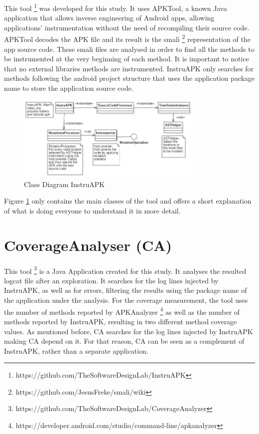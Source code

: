 This tool \footnote{https://github.com/TheSoftwareDesignLab/InstruAPK} was developed for this study. It uses APKTool, a known Java application that allows inverse engineering of Android apps, allowing applications' instrumentation without the need of recompiling their source code. APKTool decodes the APK file and its result is the smali \footnote{https://github.com/JesusFreke/smali/wiki} representation of the app source code. These smali files are analysed in order to find all the methods to be instrumented at the very beginning of each method. It is important to notice that no external libraries methods are instrumented. InstruAPK only searches for methods following the android project structure that uses the application package name to store the application source code.

\begin{figure}[h]
\centering
\includegraphics[width=0.8\textwidth]{../Figures/ClassDiagramInstruAPK.jpg}
\caption{Class Diagram InstruAPK}\label{fig:instruAPK}
\end{figure}

Figure \ref{fig:instruAPK} only contains the main classes of the tool and offers a short explanation of what is doing everyone to understand it in more detail.

\section{CoverageAnalyser (CA)}\label{sec:ca}

This tool \footnote{https://github.com/TheSoftwareDesignLab/CoverageAnalyzer} is a Java Application created for this study. It analyses the resulted logcat file after an exploration. It searches for the log lines injected by InstruAPK, as well as for errors, filtering the results using the package name of the application under the analysis. For the coverage measurement, the tool uses the number of methods reported by APKAnalyzer \footnote{https://developer.android.com/studio/command-line/apkanalyzer} as well as the number of methods reported by InstruAPK, resulting in two different method coverage values. As mentioned before, CA searches for the log lines injected by InstruAPK making CA depend on it. For that reason, CA can be seen as a complement of InstruAPK, rather than a separate application.


